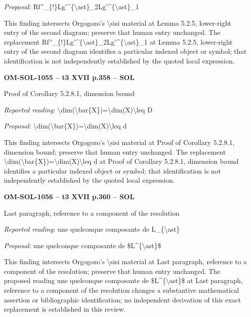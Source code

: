 \emph{Proposal}: Rf''\_\{!\}Lg'\textasciicircum{}\{\textbackslash{}ast\}\_2Lg'\textasciicircum{}\{\textbackslash{}ast\}\_1\par
This finding intersects Orgogozo's \textbackslash{}sisi material at Lemma 5.2.5, lower-right entry of the second diagram; preserve that human entry unchanged. The replacement Rf''\_\{!\}Lg'\textasciicircum{}\{\textbackslash{}ast\}\_2Lg'\textasciicircum{}\{\textbackslash{}ast\}\_1 at Lemma 5.2.5, lower-right entry of the second diagram identifies a particular indexed object or symbol; that identification is not independently established by the quoted local expression.\par
\par\noindent\textbf{OM-SOL-1055 -- t3 XVII p.358 -- SOL}\par
Proof of Corollary 5.2.8.1, dimension bound\par
\emph{Reported reading}: \textbackslash{}dim(\textbackslash{}bar\{X\})=\allowbreak \textbackslash{}dim(X)\textbackslash{}leq D\par
\emph{Proposal}: \textbackslash{}dim(\textbackslash{}bar\{X\})=\allowbreak \textbackslash{}dim(X)\textbackslash{}leq d\par
This finding intersects Orgogozo's \textbackslash{}sisi material at Proof of Corollary 5.2.8.1, dimension bound; preserve that human entry unchanged. The replacement \textbackslash{}dim(\textbackslash{}bar\{X\})=\allowbreak \textbackslash{}dim(X)\textbackslash{}leq d at Proof of Corollary 5.2.8.1, dimension bound identifies a particular indexed object or symbol; that identification is not independently established by the quoted local expression.\par
\par\noindent\textbf{OM-SOL-1056 -- t3 XVII p.360 -- SOL}\par
Last paragraph, reference to a component of the resolution\par
\emph{Reported reading}: une quelconque composante de L\_\{\textbackslash{}ast\}\par
\emph{Proposal}: une quelconque composante de \$L\textasciicircum{}\{\textbackslash{}ast\}\$\par
This finding intersects Orgogozo's \textbackslash{}sisi material at Last paragraph, reference to a component of the resolution; preserve that human entry unchanged. The proposed reading une quelconque composante de \$L\textasciicircum{}\{\textbackslash{}ast\}\$ at Last paragraph, reference to a component of the resolution changes a substantive mathematical assertion or bibliographic identification; no independent derivation of this exact replacement is established in this review.\par
